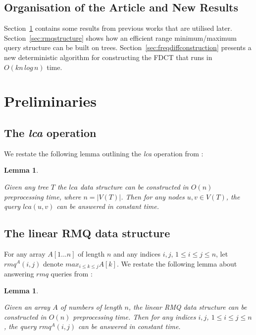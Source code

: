 \documentclass{article}
\newtheorem{lca}[incompatibility]{Lemma}
\newtheorem{linearrmq}[incompatibility]{Lemma}
\begin{document}
    \subsection{Organisation of the Article and New Results}
    Section~\ref{sec:preliminaries} contains some results from previous works that are utilised later. Section~\ref{sec:rmqstructure} shows how an efficient range minimum/maximum query structure can be built on trees. Section~\ref{sec:freqdiffconstruction} presents a new deterministic algorithm for constructing the FDCT that runs in $O(kn\,log\,n)$ time.

    \section{Preliminaries}
    \label{sec:preliminaries}

    \subsection{The \textit{lca} operation}

    We restate the following lemma outlining the \textit{lca} operation from \cite{bender2000lca}:
    \newline

    \begin{lca}
        \label{lem:lca}

        Given any tree $T$ the $lca$ data structure can be constructed in $O(n)$ preprocessing time, where $n = |V(T)|$. Then for any nodes $u, v \in V(T)$, the query $lca(u, v)$ can be answered in constant time.
    \end{lca}

    \subsection{The linear RMQ data structure}

    For any array $A[1 ... n]$ of length $n$ and any indices $i, j$, $1 \leq i \leq j \leq n$, let $rmq^A(i, j)$ denote $max_{i \leq k \leq j}A[k]$. We restate the following lemma about answering $rmq$ queries from \cite{bender2000lca}:
    \newline

    \begin{linearrmq}
        \label{lem:linearrmq}

        Given an array $A$ of numbers of length $n$, the \textit{linear RMQ data structure} can be constructed in $O(n)$ preprocessing time. Then for any indices $i, j$, $1 \leq i \leq j \leq n$, the query $rmq^A(i, j)$ can be answered in constant time.
    \end{linearrmq}
\end{document}
